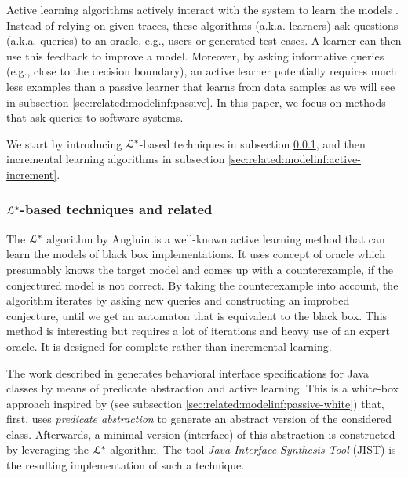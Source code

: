 Active learning algorithms actively interact with the system to
learn the models \cite{settles.tr09}. Instead of relying on given
traces, these algorithms (a.k.a. learners) ask questions (a.k.a.
queries) to an oracle, e.g., users or generated test cases. A
learner can then use this feedback to improve a model. Moreover,
by asking informative queries (e.g., close to the decision
boundary), an active learner potentially requires much less
examples than a passive learner that learns from data samples as
we will see in subsection \ref{sec:related:modelinf:passive}. In this paper, we focus
on methods that ask queries to software systems.

We start by introducing $\EuScript{L}^*$-based techniques in
subsection \ref{sec:related:modelinf:active-letoile}, and then incremental learning
algorithms in subsection \ref{sec:related:modelinf:active-increment}.

\subsubsection{$\EuScript{L}^*$-based techniques and related}
\label{sec:related:modelinf:active-letoile}

The $\EuScript{L}^*$ algorithm by Angluin \cite{Angluin198787} is
a well-known active learning method that can learn the models of
black box implementations. It uses concept of oracle which
presumably knows the target model and comes up with a
counterexample, if the conjectured model is not correct. By
taking the counterexample into account, the algorithm iterates by
asking new queries and constructing an improbed conjecture, until
we get an automaton that is equivalent to the black box. This
method is interesting but requires a lot of iterations and heavy
use of an expert oracle. It is designed for complete rather
than incremental learning.

The work described in \cite{Alur:2005:SIS:1047659.1040314}
generates behavioral interface specifications for Java classes by
means of predicate abstraction and active learning. This is a
white-box approach inspired by
\cite{Whaley:2002:AEO:566171.566212} (see subsection
\ref{sec:related:modelinf:passive-white}) that, first, uses \textit{predicate
abstraction} to generate an abstract version of the considered
class. Afterwards, a minimal version (interface) of this
abstraction is constructed by leveraging the $\EuScript{L}^*$
algorithm. The tool \textit{Java Interface Synthesis Tool} (JIST)
is the resulting implementation of such a technique.

